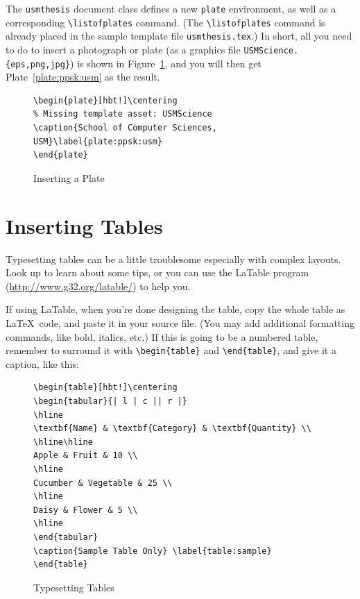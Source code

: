 The \texttt{usmthesis} document class defines a new \texttt{plate} environment, as well as a corresponding \verb|\listofplates| command.  (The \verb|\listofplates| command is already placed in the sample template file \verb|usmthesis.tex|.)  In short, all you need to do to insert a photograph or plate (as a graphics file \verb|USMScience.{eps,png,jpg}|) is shown in Figure~\ref{fig:lst:plate}, and you will then get Plate~\ref{plate:ppsk:usm} as the result.


\begin{figure}[hbt!]
  \begin{lstlisting}
\begin{plate}[hbt!]\centering
% Missing template asset: USMScience
\caption{School of Computer Sciences, USM}\label{plate:ppsk:usm}
\end{plate}
\end{lstlisting}
  \caption{Inserting a Plate}\label{fig:lst:plate}
\end{figure}

\begin{plate}[hbt!]\centering
  \caption{School of Computer Sciences, USM}\label{plate:ppsk:usm}
\end{plate}


\section{Inserting Tables}

Typesetting tables can be a little troublesome especially with complex layouts.  Look up \citep{roberts} to learn about some tips, or you can use the \textrm{LaTable} program (\url{http://www.g32.org/latable/}) to help you.

If using \textrm{LaTable}, when you're done designing the table, copy the whole table as \LaTeX\ code, and paste it in your source file.  (You may add additional formatting commands, like bold, italics, etc.)  If this is going to be a numbered table, remember to surround it with \verb|\begin{table}| and \verb|\end{table}|, and give it a caption, like this:

\begin{figure}[hbt!]
  \begin{lstlisting}
\begin{table}[hbt!]\centering
\begin{tabular}{| l | c || r |}
\hline
\textbf{Name} & \textbf{Category} & \textbf{Quantity} \\ 
\hline\hline
Apple & Fruit & 10 \\ 
\hline
Cucumber & Vegetable & 25 \\ 
\hline
Daisy & Flower & 5 \\ 
\hline
\end{tabular}
\caption{Sample Table Only} \label{table:sample}
\end{table}
\end{lstlisting}
  \caption{Typesetting Tables}\label{fig:lst:table}
\end{figure}

